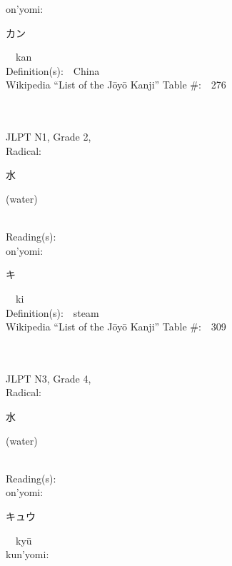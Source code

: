 \begin{multicols}{2}
{\hspace*{1em}}on'yomi:\ \ \\
{\hspace*{2em}}{\begin{CJK}{UTF8}{min} カン \end{CJK}}\ \ kan\ \ \\
Definition(s):\ \ China \\
Wikipedia ``List of the J\=oy\=o Kanji'' Table \#:\ \ 276 \\
\ \ \\
{\fontsize{34pt}{40pt}  }\ \ \\  %
{JLPT N1, Grade 2, \\Radical:\ \ {\begin{CJK}{UTF8}{min} 水 \end{CJK}} (water) } \\
Reading(s):\ \ \\
{\hspace*{1em}}on'yomi:\ \ \\
{\hspace*{2em}}{\begin{CJK}{UTF8}{min} キ \end{CJK}}\ \ ki\ \ \\
Definition(s):\ \ steam \\
Wikipedia ``List of the J\=oy\=o Kanji'' Table \#:\ \ 309 \\
\ \ \\
{\fontsize{34pt}{40pt}  }\ \ \\  %
{JLPT N3, Grade 4, \\Radical:\ \ {\begin{CJK}{UTF8}{min} 水 \end{CJK}} (water) } \\
Reading(s):\ \ \\
{\hspace*{1em}}on'yomi:\ \ \\
{\hspace*{2em}}{\begin{CJK}{UTF8}{min} キュウ \end{CJK}}\ \ ky\=u\ \ \\
{\hspace*{1em}}kun'yomi:\ \ \\

\end{multicols}
